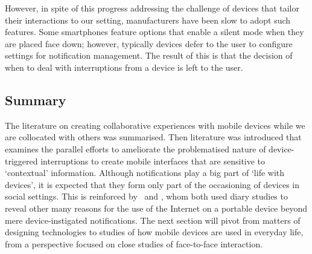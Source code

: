 However, in spite of this progress addressing the challenge of devices that tailor their interactions to our setting, manufacturers have been slow to adopt such features.
Some smartphones feature options that enable a silent mode when they are placed face down; however, typically devices defer to the user to configure settings for notification management.
The result of this is that the decision of when to deal with interruptions from a device is left to the user.






\crpagebreak\subsection{Summary}\label{sec:background litreview design mobilehci summary}
The literature on creating collaborative experiences with mobile devices while we are collocated with others was summarised.
Then literature was introduced that examines the parallel efforts to ameliorate the problematised nature of device-triggered interruptions to create mobile interfaces that are sensitive to `contextual' information.
Although notifications play a big part of `life with devices', it is expected that they form only part of the occasioning of devices in social settings.
This is reinforced by~\citet{Sohn2008} and \citet{Church2008}, whom both used diary studies to reveal other many reasons for the use of the Internet on a portable device beyond mere device-instigated notifications.
The next section will pivot from matters of designing technologies to studies of how mobile devices are used in everyday life, from a perspective focused on close studies of face-to-face interaction.






